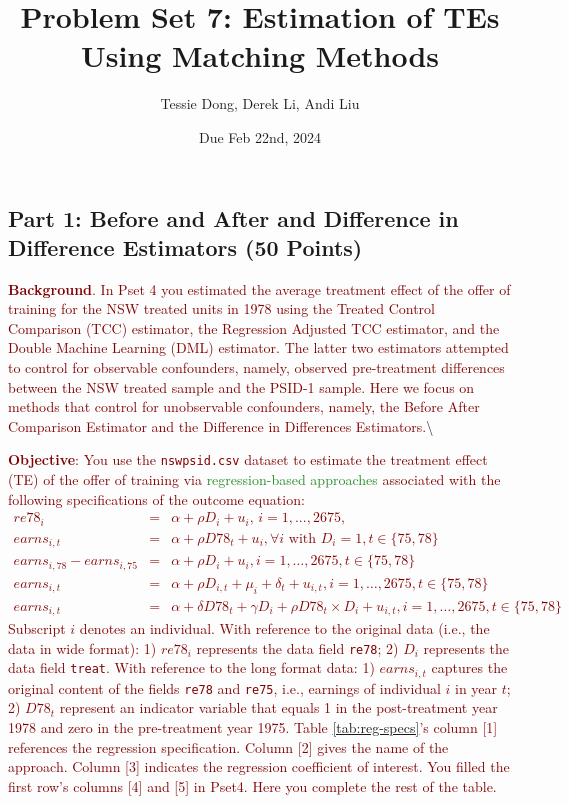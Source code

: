\documentclass[
]{article}
\title{Problem Set 7: Estimation of TEs Using Matching Methods}
\author{Tessie Dong, Derek Li, Andi Liu}
\date{Due Feb 22nd, 2024}
\begin{document}
\maketitle

\subsection{Part 1: Before and After and Difference in Difference
Estimators (50
Points)}\label{part-1-before-and-after-and-difference-in-difference-estimators-50-points}

\noindent \textcolor{Maroon}{\textbf{Background}. In Pset 4 you estimated the average treatment effect of the offer of training for the NSW treated units in 1978 using the  Treated Control Comparison (TCC) estimator, the Regression Adjusted TCC estimator, and the Double Machine Learning (DML) estimator. The latter two estimators attempted to control for observable confounders, namely, observed pre-treatment differences between the NSW treated sample and the PSID-1 sample. Here we focus on methods that control for unobservable confounders, namely, the Before After Comparison Estimator and the Difference in Differences Estimators.}\textbackslash{}

\noindent \textcolor{Maroon}{\textbf{Objective}: You use the \texttt{nswpsid.csv} dataset to estimate the treatment effect (TE) of the offer of training via \textcolor{ForestGreen}{regression-based approaches} associated with the following specifications of the outcome equation:
\begin{eqnarray}
re78_{i} &=&\alpha +\rho D_{i}+u_{i}\text{, }i=1,...,2675\text{,}
\label{TCcomp} \\
earns_{i,t} &=& \alpha + \rho D78_{t}+u_{i}, \forall i \text{ with } D_i=1, t \in \{75,78\}  \label{BAfter} \\
earns_{i,78}-earns_{i,75} &=& \alpha + \rho D_i + u_{i}, i=1,\ldots,2675, t \in \{75,78\}  \label{FD} \\
earns_{i,t} &=& \alpha + \rho D_{i,t}+ \mu_i + \delta_t + u_{i,t}, i=1,\ldots,2675, t \in \{75,78\}   \label{TWFE} \\
earns_{i,t} &=& \alpha + \delta {D78}_{t} + \gamma D_i + \rho {D78}_t \times D_i +  u_{i,t}, i=1,\ldots,2675, t \in \{75,78\}  \label{DinD} 
\end{eqnarray}
\noindent Subscript $i$ denotes an individual. With reference to the original data (i.e., the data in wide format): 1) $re78_{i}$ represents the data field \texttt{re78}; 2) $D_{i}$ represents the data field \texttt{treat}. With reference to the long format data: 1) $earns_{i,t}$ captures the original content of the fields \texttt{re78} and \texttt{re75}, i.e., earnings of individual $i$ in year $t$; 2) ${D78}_{t}$ represent an indicator variable that equals 1 in the post-treatment year 1978 and zero in the pre-treatment year 1975. Table \ref{tab:reg-specs}'s column [1] references the regression specification. Column [2] gives the name of the approach. Column [3] indicates the regression coefficient of interest. You filled the first row's columns [4] and [5] in Pset4. Here you complete the rest of the table.}
\end{document}
